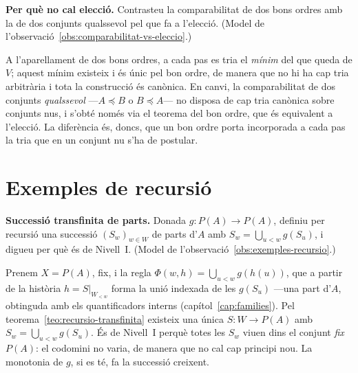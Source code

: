\begin{exercici}
\textbf{Per què no cal elecció.} Contrasteu la comparabilitat de dos bons ordres amb la de dos conjunts qualssevol pel que fa a l'elecció. (Model de l'observació~\ref{obs:comparabilitat-vs-eleccio}.)
\end{exercici}
\begin{solucio}
A l'aparellament de dos bons ordres, a cada pas es tria el \emph{mínim} del que queda de \(V\); aquest mínim existeix i és únic pel bon ordre, de manera que no hi ha cap tria arbitrària i tota la construcció és canònica. En canvi, la comparabilitat de dos conjunts \emph{qualssevol} ---\(A\preceq B\) o \(B\preceq A\)--- no disposa de cap tria canònica sobre conjunts nus, i s'obté només via el teorema del bon ordre, que és equivalent a l'elecció. La diferència és, doncs, que un bon ordre porta incorporada a cada pas la tria que en un conjunt nu s'ha de postular.
\end{solucio}

\section{Exemples de recursió}\label{prac:exemples-recursio}

\begin{exercici}
\textbf{Successió transfinita de parts.} Donada \(g\colon P(A)\to P(A)\), definiu per recursió una successió \((S_w)_{w\in W}\) de parts d'\(A\) amb \(S_w=\bigcup_{u<w}g(S_u)\), i digueu per què és de Nivell~I. (Model de l'observació~\ref{obs:exemples-recursio}.)
\end{exercici}
\begin{solucio}
Prenem \(X=P(A)\), fix, i la regla \(\Phi(w,h)=\bigcup_{u<w}g(h(u))\), que a partir de la història \(h=S|_{W_{<w}}\) forma la unió indexada de les \(g(S_u)\) ---una part d'\(A\), obtinguda amb els quantificadors interns (capítol~\ref{cap:families}). Pel teorema~\ref{teo:recursio-transfinita} existeix una única \(S\colon W\to P(A)\) amb \(S_w=\bigcup_{u<w}g(S_u)\). És de Nivell~I perquè totes les \(S_w\) viuen dins el conjunt \emph{fix} \(P(A)\): el codomini no varia, de manera que no cal cap principi nou. La monotonia de \(g\), si es té, fa la successió creixent.
\end{solucio}

